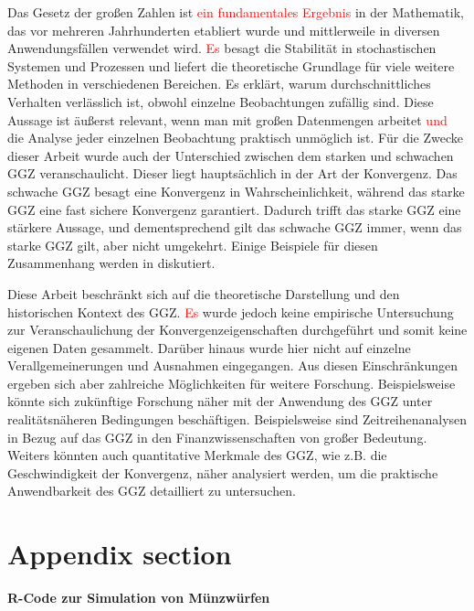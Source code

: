 \documentclass[aodsor,preprint]{imsart}
\numberwithin{equation}{section}
\theoremstyle{plain}
\begin{document}
Das Gesetz der großen Zahlen ist \textcolor{red}{ein fundamentales Ergebnis} in der Mathematik, das vor mehreren Jahrhunderten etabliert wurde und mittlerweile in diversen Anwendungsfällen verwendet wird.
\textcolor{red}{Es} besagt die Stabilität in stochastischen Systemen und Prozessen und liefert die theoretische Grundlage für viele weitere Methoden in verschiedenen Bereichen.
Es erklärt, warum durchschnittliches Verhalten verlässlich ist, obwohl einzelne Beobachtungen zufällig sind.
Diese Aussage ist äußerst relevant, wenn man mit großen Datenmengen arbeitet \textcolor{red}{und} die Analyse jeder einzelnen Beobachtung praktisch unmöglich ist.
Für die Zwecke dieser Arbeit wurde auch der Unterschied zwischen dem starken und schwachen GGZ veranschaulicht.
Dieser liegt hauptsächlich in der Art der Konvergenz.
Das schwache GGZ besagt eine Konvergenz in Wahrscheinlichkeit, während das starke GGZ eine fast sichere Konvergenz garantiert.
Dadurch trifft das starke GGZ eine stärkere Aussage, und dementsprechend gilt das schwache GGZ immer, wenn das starke GGZ gilt, aber nicht umgekehrt.
Einige Beispiele für diesen Zusammenhang werden in \citet{stoyanov2013} diskutiert.


Diese Arbeit beschränkt sich auf die theoretische Darstellung und den historischen Kontext des GGZ.
\textcolor{red}{Es} wurde jedoch keine empirische Untersuchung zur Veranschaulichung der Konvergenzeigenschaften durchgeführt und somit keine eigenen Daten gesammelt.
Darüber hinaus wurde hier nicht auf einzelne Verallgemeinerungen und Ausnahmen eingegangen.
Aus diesen Einschränkungen ergeben sich aber zahlreiche Möglichkeiten für weitere Forschung.
Beispielsweise könnte sich zukünftige Forschung näher mit der Anwendung des GGZ unter realitätsnäheren Bedingungen beschäftigen.
Beispielsweise sind Zeitreihenanalysen in Bezug auf das GGZ in den Finanzwissenschaften von großer Bedeutung.
Weiters könnten auch quantitative Merkmale des GGZ, wie z.B. die Geschwindigkeit der Konvergenz, näher analysiert werden, um die praktische Anwendbarkeit des GGZ detailliert zu untersuchen.

\newpage


\appendix


\section{Appendix section}
\label{sec:app}

\textbf{R-Code zur Simulation von Münzwürfen}
\end{document}
